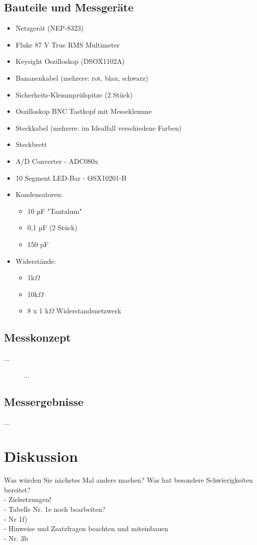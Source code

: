 \documentclass[a4paper,12pt]{article}
\begin{document}
\subsection{Bauteile und Messgeräte}
\begin{itemize}
\item Netzgerät (NEP-8323)
\item Fluke 87 V True RMS Multimeter
\item Keysight Oszilloskop (DSOX1102A)
\item Bananenkabel (mehrere: rot, blau, schwarz)
\item Sicherheits-Klemmprüfspitze (2 Stück)
\item Oszilloskop BNC Tastkopf mit Messeklemme
\item Steckkabel (mehrere: im Idealfall verschiedene Farben)
\item Steckbrett\\
\end{itemize}


\begin{itemize}
\item A/D Converter - ADC080x
\item 10 Segment LED-Bar - OSX10201-B
\newpage
\item Kondensatoren: 
	\begin{itemize}
	\item 10 µF "Tantalum"
	\item 0,1 µF (2 Stück)
	\item 150 pF
	\end{itemize}
\item Widerstände: 
	\begin{itemize}
	\item 1k$\Omega$
	\item 10k$\Omega$
	\item 8 x 1 k$\Omega$ Widerstandsnetzwerk
	\end{itemize}
\end{itemize}

\subsection{Messkonzept}
...

\begin{figure}[H]
    \centering
\caption{...}
\end{figure}


\subsection{Messergebnisse}
...




\section{Diskussion}
Was würden Sie nächstes Mal anders machen? Was hat besondere Schwierigkeiten bereitet?\\

- Zielsetzungen!\\

- Tabelle Nr. 1e noch  bearbeiten?\\
- Nr 1f)\\
- Hinweise und Zsatzfragen beachten und miteinbauen\\

- Nr. 3b 
\end{document}
